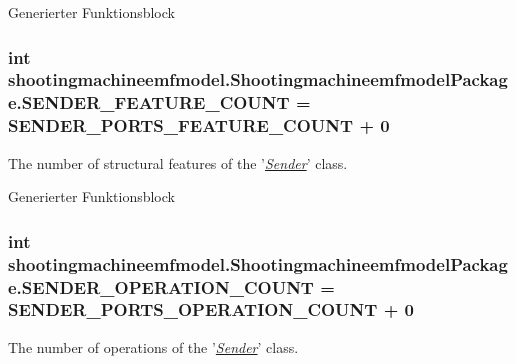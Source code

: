 Generierter Funktionsblock  \hypertarget{interfaceshootingmachineemfmodel_1_1_shootingmachineemfmodel_package_a8a9aaa95507322260fbb9649b67d5539}{
\subsubsection[{S\-E\-N\-D\-E\-R\-\_\-\-F\-E\-A\-T\-U\-R\-E\-\_\-\-C\-O\-U\-N\-T}]{\setlength{\rightskip}{0pt plus 5cm}int shootingmachineemfmodel.\-Shootingmachineemfmodel\-Package.\-S\-E\-N\-D\-E\-R\-\_\-\-F\-E\-A\-T\-U\-R\-E\-\_\-\-C\-O\-U\-N\-T = {\bf S\-E\-N\-D\-E\-R\-\_\-\-P\-O\-R\-T\-S\-\_\-\-F\-E\-A\-T\-U\-R\-E\-\_\-\-C\-O\-U\-N\-T} + 0}}\label{interfaceshootingmachineemfmodel_1_1_shootingmachineemfmodel_package_a8a9aaa95507322260fbb9649b67d5539}
The number of structural features of the '{\itshape \hyperlink{interfaceshootingmachineemfmodel_1_1_sender}{Sender}}' class.

Generierter Funktionsblock  \hypertarget{interfaceshootingmachineemfmodel_1_1_shootingmachineemfmodel_package_a9ed096474c4b1ffd51eb8c38df19abfc}{
\subsubsection[{S\-E\-N\-D\-E\-R\-\_\-\-O\-P\-E\-R\-A\-T\-I\-O\-N\-\_\-\-C\-O\-U\-N\-T}]{\setlength{\rightskip}{0pt plus 5cm}int shootingmachineemfmodel.\-Shootingmachineemfmodel\-Package.\-S\-E\-N\-D\-E\-R\-\_\-\-O\-P\-E\-R\-A\-T\-I\-O\-N\-\_\-\-C\-O\-U\-N\-T = {\bf S\-E\-N\-D\-E\-R\-\_\-\-P\-O\-R\-T\-S\-\_\-\-O\-P\-E\-R\-A\-T\-I\-O\-N\-\_\-\-C\-O\-U\-N\-T} + 0}}\label{interfaceshootingmachineemfmodel_1_1_shootingmachineemfmodel_package_a9ed096474c4b1ffd51eb8c38df19abfc}
The number of operations of the '{\itshape \hyperlink{interfaceshootingmachineemfmodel_1_1_sender}{Sender}}' class.

